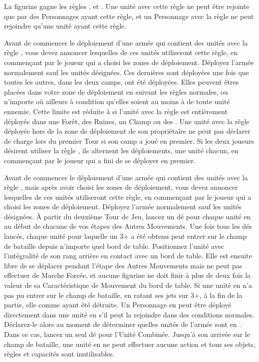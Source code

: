 
La figurine gagne les règles \magicalattacks{}, \immunetopsychology{} et . Une unité avec cette règle ne peut être rejointe que par des Personnages ayant cette règle, et un Personnage avec la règle \otherworldly{} ne peut rejoindre qu'une unité ayant cette règle.


Avant de commencer le déploiement d'une armée qui contient des unités avec la règle \scout{}, vous devez annoncer lesquelles de ces unités utiliseront cette règle, en commençant par le joueur qui a choisi les zones de déploiement. Déployez l'armée normalement sauf les unités désignées. Ces dernières sont déployées une fois que toutes les autres, dans les deux camps, ont été déployées. Elles peuvent êtres placées dans votre zone de déploiement en suivant les règles normales, ou n'importe où ailleurs à condition qu'elles soient au moins à  de toute unité ennemie. Cette limite est réduite à  si l'unité avec la règle \scout{} est entièrement déployée dans une Forêt, des Ruines, un Champ ou des \water{}. Une unité avec la règle \scout{} déployée hors de la zone de déploiement de son propriétaire ne peut pas déclarer de charge lors du premier Tour si son camp a joué en premier. Si les deux joueurs désirent utiliser la règle \scout{}, ils alternent les déploiements, une unité chacun, en commençant par le joueur qui a fini de se déployer en premier.


Avant de commencer le déploiement d'une armée qui contient des unités avec la règle \ambush{}, mais après avoir choisi les zones de déploiement, vous devez annoncer lesquelles de ces unités utiliseront cette règle, en commençant par le joueur qui a choisi les zones de déploiement. Déployez l'armée normalement sauf les unités désignées. À partir du deuxième Tour de Jeu, lancez un dé pour chaque unité en \ambush{} au début de chacune de vos étapes des Autres Mouvements. Une fois tous les dés lancés, chaque unité pour laquelle un 3+ a été obtenu peut entrer sur le champ de bataille depuis n'importe quel bord de table. Positionnez l'unité avec l'intégralité de son rang arrière en contact avec un bord de table. Elle est ensuite libre de se déplacer pendant l'étape des Autres Mouvements mais ne peut pas effectuer de Marche Forcée, et aucune figurine ne doit finir à plus de deux fois la valeur de sa Caractéristique de Mouvement du bord de table. Si une unité en \ambush{} n'a pas pu entrer sur le champ de bataille, en ratant ses jets sur 3+, à la fin de la partie, elle comme ayant été détruite. Un Personnage en \ambush{} peut être déployé directement dans une unité en \ambush{} s'il peut la rejoindre dans des conditions normales. Déclarez-le alors au moment de déterminer quelles unités de l'armée sont en \ambush{}. Dans ce cas, lancez un seul dé pour l'Unité Combinée. Jusqu'à son arrivée sur le champ de bataille, une unité en \ambush{} ne peut effectuer aucune action et tous ses objets, règles et capacités sont inutilisables.

